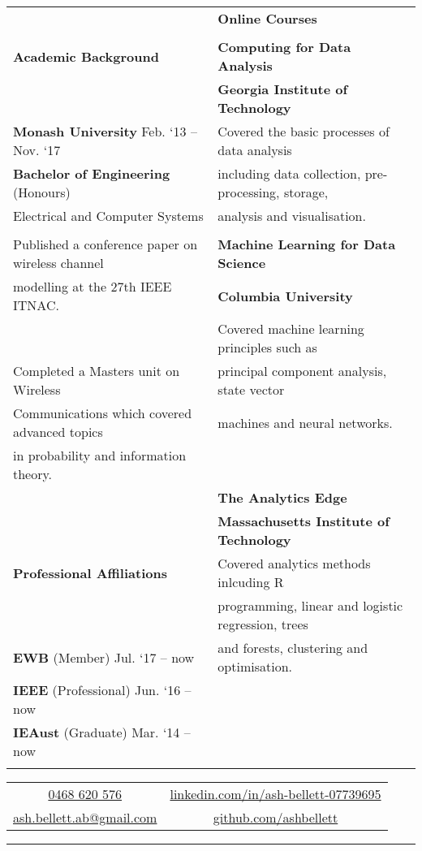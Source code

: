 \documentclass{letter}
\begin{document}
\begin{center}
\begin{tabularx}{\textwidth}{X | X}
	 & \Large \textbf{Online Courses}\\
	 \cline{1-1}
	 & \\
	\Large \textbf{Academic Background} & \textbf{Computing for Data Analysis}\\
	 & \textbf{Georgia Institute of Technology}\\
	\textbf{Monash University} \hfill Feb. `13 -- Nov. `17 & Covered the basic processes of data analysis\\
	\textbf{Bachelor of Engineering} (Honours) & including data collection, pre-processing, storage,\\
	Electrical and Computer Systems & analysis and visualisation.\\
	 & \\
	Published a conference paper on wireless channel & \textbf{Machine Learning for Data Science}\\
	modelling at the 27th IEEE ITNAC. & \textbf{Columbia University}\\
	 & Covered machine learning principles such as\\
	Completed a Masters unit on Wireless & principal component analysis, state vector\\
	Communications which covered advanced topics & machines and neural networks.\\
	in probability and information theory. & \\
	 & \textbf{The Analytics Edge}\\
	\cline{1-1}
	 & \textbf{Massachusetts Institute of Technology}\\
	\Large \textbf{Professional Affiliations} & Covered analytics methods inlcuding R\\
	 & programming, linear and logistic regression, trees\\
	\textbf{EWB} (Member) \hfill Jul. `17 -- now & and forests, clustering and optimisation.\\
	\textbf{IEEE} (Professional) \hfill Jun. `16 -- now & \\
	\cline{2-2}
	\textbf{IEAust} (Graduate) \hfill Mar. `14 -- now & \\
	 & \\
	\cline{1-1}
	\end{tabularx}
	\end{center}
	\begin{center}
	\begin{tabular}{cc}
	\href{tel:61468620576}{0468 620 576} & \href{https://www.linkedin.com/in/ash-bellett-07739695}{linkedin.com/in/ash-bellett-07739695}\\
	\href{mailto:ash.bellett.ab@gmail.com}{ash.bellett.ab@gmail.com} & \href{https://www.github.com/ashbellett}{github.com/ashbellett}
	\end{tabular}
	\end{center}
	\rule{\textwidth}{2mm}
	
\end{document}
